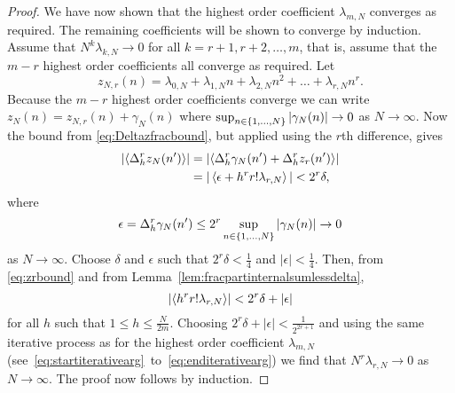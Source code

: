 \documentclass[journal]{IEEEtran}
\begin{document}
\begin{proof}
We have now shown that the highest order coefficient $\lambda_{m,N}$ converges as required. The remaining coefficients will be shown to converge by induction.  Assume that $N^k \lambda_{k,N} \rightarrow 0$ for all $k=r+1, r+2, \dots, m$, that is, assume that the $m-r$ highest order coefficients all converge as required. Let
\[
z_{N,r}(n) = \lambda_{0,N} + \lambda_{1,N} n + \lambda_{2,N} n^2 + \dots + \lambda_{r,N} n^r.
\]
Because the $m-r$ highest order coefficients converge we can write $z_N(n) = z_{N,r}(n) + \gamma_N(n)$ where $\sup_{n\in\{1,\dots,N\}}\left\vert \gamma_N(n) \right\vert \rightarrow 0$ as $N\rightarrow\infty$. Now the bound from \eqref{eq:Deltazfracbound}, but applied using the $r$th difference, gives
 \begin{equation}\label{eq:zrbound}
\begin{split}
\left|\fracpart{  \Delta_h^r z_N(n')}\right| &= \left|\fracpart{  \Delta_h^r\gamma_N(n') + \Delta_h^r z_r(n') }\right| 
\\ &= |\fracpart{ \epsilon + h^r r! \lambda_{r,N} }| < 2^r\delta,
\end{split}
 \end{equation}
 where
\[
\epsilon = \Delta_h^r \gamma_N(n') \leq 2^r \sup_{n\in\{1,\dots,N\}}\left\vert \gamma_N(n) \right\vert \rightarrow 0
\] 
as $N\rightarrow\infty$.  Choose $\delta$ and $\epsilon$ such that $2^r\delta < \tfrac{1}{4}$ and $|\epsilon| < \tfrac{1}{4}$.  Then, from \eqref{eq:zrbound} and from Lemma~\ref{lem:fracpartinternalsumlessdelta},
\[
\left\vert \left\langle  h^r r! \lambda_{r,N}  \right\rangle \right\vert < 2^r\delta + \left\vert \epsilon \right\vert
\]
for all $h$ such that $1 \leq h \leq \tfrac{N}{2m}$.  Choosing $2^r\delta + |\epsilon| < \frac{1}{2^{2r+1}}$ and using the same iterative process as for the highest order coefficient $\lambda_{m,N}$  (see~\eqref{eq:startiterativearg}~to~\eqref{eq:enditerativearg}) we find that $N^r \lambda_{r,N} \rightarrow 0$ as $N\rightarrow\infty$.  The proof now follows by induction.
 \end{proof}

\end{document}
